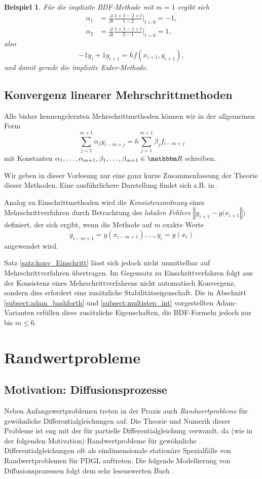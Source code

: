 \documentclass[12pt,a4paper]{book}
\theoremstyle{break}
\newtheorem{beispiel}[theorem]{Beispiel}
\theoremstyle{nonumberplain}
\newcommand{\R}{\mathbbm R}
\newcommand{\norm}[1]{\left\Vert#1\right\Vert}		%
\newcommand{\1}{\mathbbm{1}} 			      	%
\begin{document}
\begin{beispiel}
Für die implizite BDF-Methode mit $m=1$ ergibt sich
\begin{align*}
\alpha_1 &=  \frac{\partial}{\partial t}  
 \frac{1+1-2+t}{1-2}\Big|_{t=0}=-1,\\
\alpha_2 &=\frac{\partial}{\partial t}  
 \frac{1+1-1+t}{2-1}\Big|_{t=0}=1,
\end{align*}
also 
\[
-1 y_i + 1y_{i+1} = hf(x_{i+1},y_{i+1}),
\]
und damit gerade die implizite Euler-Methode.
\end{beispiel}

\subsection{Konvergenz linearer Mehrschrittmethoden}

Alle bisher kennengelernten Mehrschrittmethoden können wir in der allgemeinen Form
\[
\sum_{j=1}^{m+1} \alpha_j  y_{i-m+j} = h \sum_{j=1}^{m+1} \beta_j  f_{i-m+j}
\]
mit Konstanten $\alpha_1,\ldots,\alpha_{m+1},\beta_1,\ldots,\beta_{m+1}\in \R$ schreiben.

Wir geben in dieser Vorlesung nur eine ganz kurze Zusammenfassung der Theorie dieser Methoden.
Eine ausführlichere Darstellung findet sich z.B. in \cite{HairerNorsettWanner}.

Analog zu Einschrittmethoden wird die \emph{Konsistenzordnung} eines Mehrschrittverfahren
durch Betrachtung des \emph{lokalen Fehlers} $\norm{y_{i+1}-y(x_{i+1}})$
definiert, der sich ergibt, wenn die Methode
auf $m$ exakte Werte 
\[
y_{i-m+1}=y(x_{i-m+1}),\ldots,y_{i}=y(x_i)
\]
angewendet wird.

Satz \ref{satz:konv_Einschritt} lässt sich jedoch nicht unmittelbar auf Mehrschrittverfahren
übertragen. Im Gegensatz zu Einschrittverfahren folgt aus der Konsistenz eines Mehrschrittverfahrens
nicht automatisch Konvergenz, sondern dies erfordert eine zusätzliche Stabilitätseigenschaft.
Die in Abschnitt \ref{subsect:adam_bashforth} und \ref{subsect:multistep_int} vorgestellten
Adam-Varianten erfüllen diese zusätzliche Eigenschaften, die BDF-Formeln jedoch nur bis
$m\leq 6$.


\section{Randwertprobleme}

\subsection{Motivation: Diffusionsprozesse}
Neben Anfangswertproblemen treten in der Praxis auch \emph{Randwertprobleme} für gewöhnliche Differentialgleichungen auf. Die Theorie und Numerik dieser Probleme ist eng mit der für partielle Differentialgleichung verwandt, da (wie in der folgenden Motivation)  Randwertprobleme für gewöhnliche Differentialgleichungen oft als eindimensionale stationäre Spezialfälle von Randwertproblemen für PDGL auftreten. Die folgende Modellierung
von Diffusionsprozessen folgt dem sehr lesenswerten Buch \cite{FulfordBroadbridge}.
\end{document}
